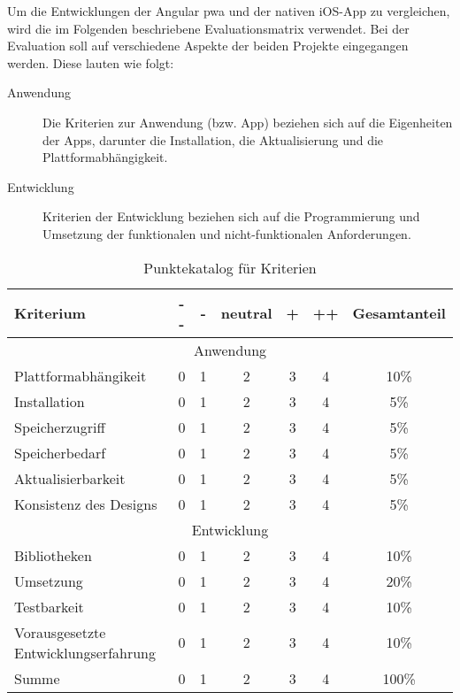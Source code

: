 Um die Entwicklungen der Angular \ac{pwa} und der nativen iOS-App zu vergleichen, wird die im Folgenden beschriebene Evaluationsmatrix verwendet. Bei der Evaluation soll auf verschiedene Aspekte der beiden Projekte eingegangen werden. Diese lauten wie folgt:
\begin{description}
	\item [Anwendung]
		Die Kriterien zur Anwendung (bzw. App) beziehen sich auf die Eigenheiten der Apps, darunter die Installation, die Aktualisierung und die Plattformabhängigkeit.
		
	\item [Entwicklung]
		Kriterien der Entwicklung beziehen sich auf die Programmierung und Umsetzung der funktionalen und nicht-funktionalen Anforderungen.
			
\end{description}

\begin{table}[h]
	\centering
	\begin{tabularx}{\textwidth}{|l||c|c|c|c|c|c|}
		\hline
		Kriterium              & - - & - & neutral & + & ++ & Gesamtanteil \\
		\hline
		\multicolumn{7}{c}{Anwendung}                                      \\
		\hline
		Plattformabhängikeit   & 0   & 1 & 2       & 3 & 4  & 10\%         \\
		Installation           & 0   & 1 & 2       & 3 & 4  & 5\%          \\
		Speicherzugriff        & 0   & 1 & 2       & 3 & 4  & 5\%          \\
		Speicherbedarf         & 0   & 1 & 2       & 3 & 4  & 5\%          \\
		Aktualisierbarkeit     & 0   & 1 & 2       & 3 & 4  & 5\%          \\
		Konsistenz des Designs & 0   & 1 & 2       & 3 & 4  & 5\%         \\

		\hline
		\multicolumn{7}{c}{Entwicklung}                                    \\
		\hline
		Bibliotheken           & 0   & 1 & 2       & 3 & 4  & 10\%         \\
		Umsetzung              & 0   & 1 & 2       & 3 & 4  & 20\%         \\
		Testbarkeit            & 0   & 1 & 2       & 3 & 4  & 10\%         \\
		Vorausgesetzte Entwicklungserfahrung    & 0   & 1 & 2       & 3 & 4  & 10\%         \\

		\hline

		\hline
		Summe                  & 0   & 1 & 2       & 3 & 4  & 100\%        \\
		\hline
	\end{tabularx}
	\caption{Punktekatalog für Kriterien} \label{tab:punktekatalog}
\end{table}



